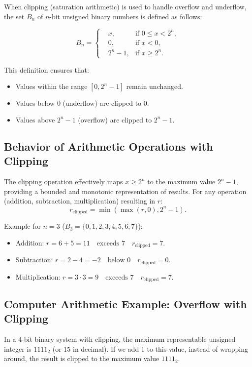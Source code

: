 When clipping (saturation arithmetic) is used to handle overflow and underflow, the set \( B_n \) of \( n \)-bit unsigned binary numbers is defined as follows:

\[
B_n = \left\{ 
\begin{aligned}
&x, &\text{if } 0 \leq x < 2^n, \\
&0, &\text{if } x < 0, \\
&2^n - 1, &\text{if } x \geq 2^n.
\end{aligned}
\right.
\]

This definition ensures that:
\begin{itemize}
    \item Values within the range \( [0, 2^n - 1] \) remain unchanged.
    \item Values below \( 0 \) (underflow) are clipped to \( 0 \).
    \item Values above \( 2^n - 1 \) (overflow) are clipped to \( 2^n - 1 \).
\end{itemize}

\subsection{Behavior of Arithmetic Operations with Clipping}
The clipping operation effectively maps \( x \geq 2^n \) to the maximum value \( 2^n - 1 \), providing a bounded and monotonic representation of results. For any operation (addition, subtraction, multiplication) resulting in \( r \):
\[
r_{\text{clipped}} = \min(\max(r, 0), 2^n - 1).
\]

Example for \( n = 3 \) (\( B_3 = \{0, 1, 2, 3, 4, 5, 6, 7\} \)):
\begin{itemize}
    \item Addition:
   \( r = 6 + 5 = 11 \quad \text{exceeds }  7  \quad r_{\text{clipped}} = 7 \).
    \item Subtraction:
   \( r = 2 - 4 = -2 \quad  \text{below } 0 \quad r_{\text{clipped}} = 0 \).
    \item Multiplication:
   \( r = 3 \cdot 3 = 9 \quad \text{exceeds } 7 \quad r_{\text{clipped}} = 7 \).
\end{itemize}



\subsection{Computer Arithmetic Example: Overflow with Clipping} \label{subsub:overflow_clipping_example}
In a 4-bit binary system with clipping, the maximum representable unsigned integer is \( 1111_2 \) (or 15 in decimal). If we add 1 to this value, instead of wrapping around, the result is clipped to the maximum value \( 1111_2 \).

